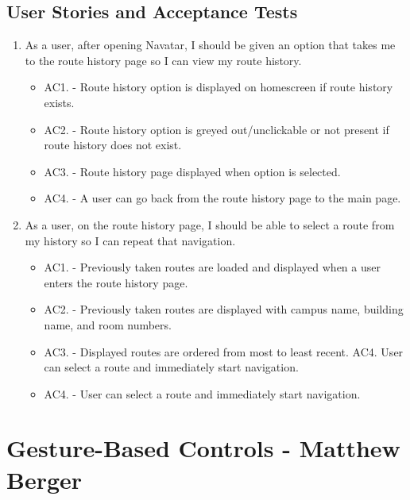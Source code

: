 \documentclass{scrreprt}
\begin{document}
\subsection{User Stories and Acceptance Tests}
\begin{enumerate}
	\item As a user, after opening Navatar, I should be given an option that takes me to the route history page so I can view my route history.
	
		\begin{itemize}
			\item AC1. - Route history option is displayed on homescreen if route history exists.
			
			\item AC2. - Route history option is greyed out/unclickable or not present if route history does not exist.

			\item AC3. - Route history page displayed when option is selected.

			\item AC4. - A user can go back from the route history page to the main page.

		\end{itemize}
	
	\item As a user, on the route history page, I should be able to select a route from my history so I can repeat that navigation.
	
		\begin{itemize}
			\item AC1. - Previously taken routes are loaded and displayed when a user enters the route history page.
			\item AC2. - Previously taken routes are displayed with campus name, building name, and room numbers.
			\item AC3. - Displayed routes are ordered from most to least recent.
AC4. User can select a route and immediately start navigation.
			\item AC4. - User can select a route and immediately start navigation.
		\end{itemize}
\end{enumerate}

\pagebreak

\section{Gesture-Based Controls - Matthew Berger}
\end{document}
